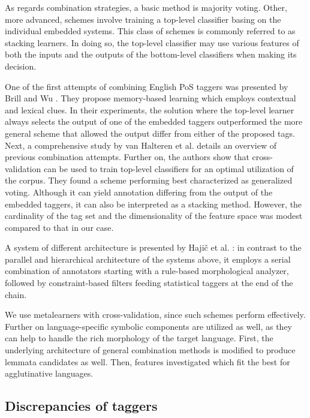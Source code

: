 As regards combination strategies, a basic method is majority voting.
Other, more advanced, schemes involve training a top-level classifier basing on the individual embedded systems.
This class of schemes is commonly referred to as stacking learners.
In doing so, the top-level classifier may use various features of both the inputs and the outputs of the bottom-level classifiers when making its decision. 

One of the first attempts of combining English PoS taggers was presented by Brill and Wu \cite{Brill1998}.
They propose memory-based learning which employs contextual and lexical clues.
In their experiments, the solution where the top-level learner always selects the output of one of the embedded taggers outperformed the more general scheme that allowed the output differ from either of the proposed tags.
Next, a comprehensive study by van Halteren et al. \cite{Halteren2001} details an overview of previous combination attempts.
Further on, the authors show that cross-validation can be used to train top-level classifiers for an optimal utilization of the corpus.
They found a scheme performing best characterized as generalized voting.
Although it can yield annotation differing from the output of the embedded taggers, it can also be interpreted as a stacking method.
However, the cardinality of the tag set and the dimensionality of the feature space was modest compared to that in our case.

A system of different architecture is presented by Hajič et al. \cite{Hajic2001}: in contrast to the parallel and hierarchical architecture of the systems above, it employs a serial combination of annotators starting with a rule-based morphological analyzer, followed by constraint-based filters feeding statistical taggers at the end of the chain. 

We use metalearners with cross-validation, since such schemes \cite{Brill1998,Halteren2001} perform effectively.
Further on language-specific symbolic components are utilized as well, as they can help to handle the rich morphology of the target language.
First, the underlying architecture of general combination methods is modified to produce lemmata candidates as well.
Then, features investigated which fit the best for agglutinative languages.

\subsection{Discrepancies of taggers}

